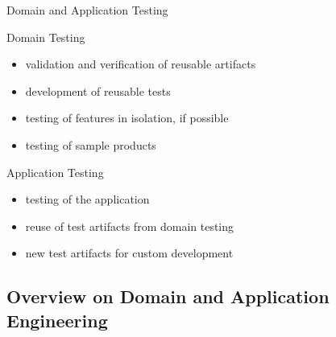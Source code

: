 \begin{frame}{Domain and Application Testing}
	\begin{mycolumns}[T,columns=3,widths={10}]
		\renewcommand{\projectcartoonwidth}{1}
	\mynextcolumn
		\begin{definition}{Domain Testing} %
			\begin{itemize}
				\item validation and verification of reusable artifacts
				\item development of reusable tests
				\item testing of features in isolation, if possible
				\item testing of sample products\\
			\end{itemize}
		\end{definition}
	\mynextcolumn
		\begin{definition}{Application Testing}
			\begin{itemize}
				\item testing of the application
				\item reuse of test artifacts from domain testing
				\item new test artifacts for custom development
			\end{itemize}
		\end{definition}
	\end{mycolumns}
\end{frame}

\subsection{Overview on Domain and Application Engineering}

